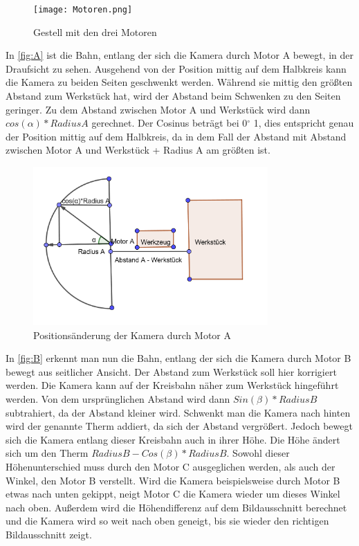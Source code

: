 \documentclass[12pt,a4paper,bibliography=totocnumbered,listof=totocnumbered]{scrartcl}
\begin{document}
\begin{figure}[htbp]
\centering 
\texttt{[image: Motoren.png]}
\caption{Gestell mit den drei Motoren}
\label{fig:Bild6}
\end{figure}
\break
In \autoref{fig:A} ist die Bahn, entlang der sich die Kamera durch Motor A bewegt, in der Draufsicht zu sehen. Ausgehend von der Position mittig auf dem Halbkreis kann die Kamera zu beiden Seiten geschwenkt werden. Während sie mittig den größten Abstand zum Werkstück hat, wird der Abstand beim Schwenken zu den Seiten geringer. Zu dem Abstand zwischen Motor A und Werkstück wird dann $cos(\alpha) * Radius A$ gerechnet. Der Cosinus beträgt bei 0$^\circ$ 1, dies entspricht genau der Position mittig auf dem Halbkreis, da in dem Fall der Abstand mit Abstand zwischen Motor A und Werkstück + Radius A am größten ist. 
\begin{figure}[htbp]
\centering 
\includegraphics[width=0.8\textwidth]{Motor_A.PNG}
\caption{Positionsänderung der Kamera durch Motor A}
\label{fig:A}
\end{figure}
\break
In \autoref{fig:B} erkennt man nun die Bahn, entlang der sich die Kamera durch Motor B bewegt aus seitlicher Ansicht. Der Abstand zum Werkstück soll hier korrigiert werden. Die Kamera kann auf der Kreisbahn näher zum Werkstück hingeführt werden. Von dem ursprünglichen Abstand wird dann $Sin(\beta)*Radius B$ subtrahiert, da der Abstand kleiner wird. Schwenkt man die Kamera nach hinten wird der genannte Therm addiert, da sich der Abstand vergrößert. Jedoch bewegt sich die Kamera entlang dieser Kreisbahn auch in ihrer Höhe. Die Höhe ändert sich um den Therm $Radius B - Cos(\beta) *Radius B$. Sowohl dieser Höhenunterschied muss durch den Motor C ausgeglichen werden, als auch der Winkel, den Motor B verstellt. Wird die Kamera beispielsweise durch Motor B etwas nach unten gekippt, neigt Motor C die Kamera wieder um dieses Winkel nach oben. Außerdem wird die Höhendifferenz auf dem Bildausschnitt berechnet und die Kamera wird so weit nach oben geneigt, bis sie wieder den richtigen Bildausschnitt zeigt.
\end{document}
